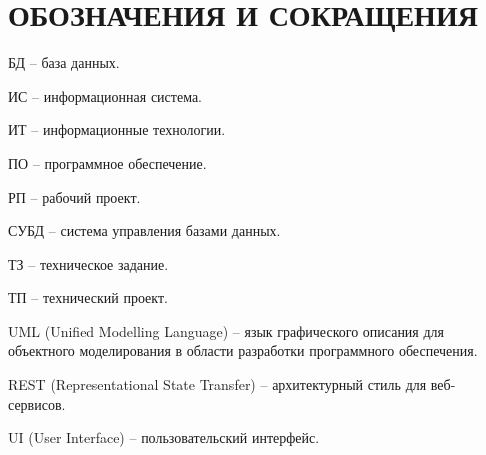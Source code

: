 \section*{ОБОЗНАЧЕНИЯ И СОКРАЩЕНИЯ}

БД -- база данных.

ИС -- информационная система.

ИТ -- информационные технологии. 

ПО -- программное обеспечение.

РП -- рабочий проект.

СУБД -- система управления базами данных.

ТЗ -- техническое задание.

ТП -- технический проект.

UML (Unified Modelling Language) -- язык графического описания для объектного моделирования в области разработки программного обеспечения.

REST (Representational State Transfer) -- архитектурный стиль для веб-сервисов.

UI (User Interface) -- пользовательский интерфейс.